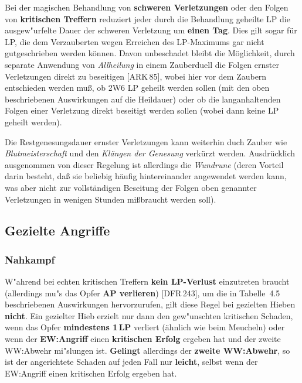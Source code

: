 \documentclass[10pt,a4paper,germanpar]{article}
\begin{document}
Bei der magischen Behandlung von \textbf{schweren Verletzungen} oder
den Folgen von \textbf{kritischen Treffern} reduziert jeder durch die
Behandlung geheilte LP die ausgew"urfelte Dauer der schweren
Verletzung um \textbf{einen Tag}. Dies gilt sogar für LP, die dem
Verzauberten wegen Erreichen des LP-Maximums gar nicht gutgeschrieben
werden können. Davon unbeschadet bleibt die Möglichkeit, durch
separate Anwendung von \emph{Allheilung} in einem Zauberduell die
Folgen ernster Verletzungen direkt zu beseitigen [ARK\,85], wobei
hier vor dem Zaubern entschieden werden muß, ob 2W6 LP geheilt werden
sollen (mit den oben beschriebenen Auswirkungen auf die Heildauer)
oder ob die langanhaltenden Folgen einer Verletzung direkt beseitigt
werden sollen (wobei dann keine LP geheilt werden).

Die Restgenesungsdauer ernster Verletzungen kann weiterhin duch Zauber
wie \emph{Blutmeisterschaft} und den \emph{Klän\-gen der Genesung}
verkürzt werden. Ausdrücklich ausgenommen von dieser Regelung ist
allerdings die \emph{Wundrune} (deren Vorteil darin besteht, daß sie
beliebig häufig hintereinander angewendet werden kann, was aber nicht
zur vollständigen Beseitung der Folgen oben genannter Verletzungen in
wenigen Stunden mißbraucht werden soll).


\subsection{Gezielte Angriffe}
\label{gezielt}

\subsubsection{Nahkampf}

W"ahrend bei echten kritischen Treffern \textbf{kein LP-Verlust}
einzutreten braucht (allerdings mu"s das Opfer \textbf{AP verlieren})
[DFR\,243], um die in Tabelle~4.5 beschriebenen Auswirkungen
hervorzurufen, gilt diese Regel bei gezielten Hieben
\textbf{nicht}. Ein gezielter Hieb erzielt nur dann den gew"unschten
kritischen Schaden, wenn das Opfer \textbf{mindestens 1\,LP} verliert
(ähnlich wie beim Meucheln) oder wenn der \textbf{EW:Angriff} einen
\textbf{kritischen Erfolg} ergeben hat und der zweite WW:Abwehr
mi"slungen ist. \textbf{Gelingt} allerdings der \textbf{zweite
  WW:Abwehr}, so ist der angerichtete Schaden auf jeden Fall nur
\textbf{leicht}, selbst wenn der EW:Angriff einen kritischen Erfolg
ergeben hat.
\end{document}
